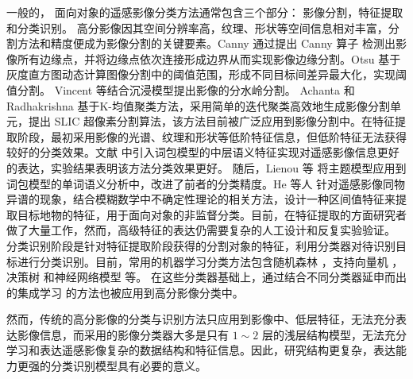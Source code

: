 一般的， 面向对象的遥感影像分类方法通常包含三个部分： 影像分割，特征提取和分类识别。 高分影像因其空间分辨率高，纹理、形状等空间信息相对丰富，分割方法和精度便成为影像分割的关键要素。Canny 通过提出 Canny 算子 \cite{canny1987computational} 检测出影像所有边缘点，并将边缘点依次连接形成边界从而实现影像边缘分割。Otsu 基于灰度直方图动态计算图像分割中的阈值范围，形成不同目标间差异最大化，实现阈值分割\cite{otsu1979threshold}。 Vincent \cite{vincent1991watersheds} 等结合沉浸模型提出影像的分水岭分割。 Achanta 和 Radhakrishna \cite{achanta2012slic} 基于K-均值聚类方法，采用简单的迭代聚类高效地生成影像分割单元，提出 SLIC 超像素分割算法，该方法目前被广泛应用到影像分割中。在特征提取阶段，最初采用影像的光谱、纹理和形状等低阶特征信息，但低阶特征无法获得较好的分类效果。文献 \cite{weizman2009urban} 中引入词包模型的中层语义特征实现对遥感影像信息更好的表达，实验结果表明该方法分类效果更好。 随后，Lienou 等\cite{lienou2010semantic} 将主题模型应用到词包模型的单词语义分析中，改进了前者的分类精度。He 等人 \cite{he2016remote} 针对遥感影像同物异谱的现象，结合模糊数学中不确定性理论的相关方法，设计一种区间值特征来提取目标地物的特征，用于面向对象的非监督分类。目前，在特征提取的方面研究者做了大量工作，然而，高级特征的表达仍需要复杂的人工设计和反复实验验证。 分类识别阶段是针对特征提取阶段获得的分割对象的特征，利用分类器对待识别目标进行分类识别。目前，常用的机器学习分类方法包含随机森林 \cite{pal2005random}，支持向量机 \cite{suykens1999least} ，决策树 \cite{friedl1997decision} 和神经网络模型 \cite{haykin1994neural} 等。 在这些分类器基础上，通过结合不同分类器延申而出的集成学习 \cite{freund1996experiments} 的方法也被应用到高分影像分类中。

然而，传统的高分影像的分类与识别方法只应用到影像中、低层特征，无法充分表达影像信息，而采用的影像分类器大多是只有 $1\sim2$ 层的浅层结构模型，无法充分学习和表达遥感影像复杂的数据结构和特征信息。因此，研究结构更复杂，表达能力更强的分类识别模型具有必要的意义。

